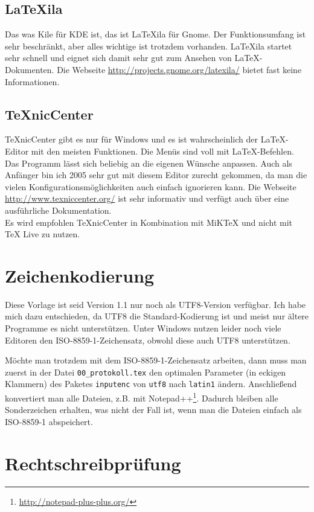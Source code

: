 \subsection{LaTeXila}

Das was Kile für KDE ist, das ist LaTeXila für Gnome. Der Funktionsumfang ist sehr beschränkt, aber alles wichtige ist trotzdem vorhanden. LaTeXila startet sehr schnell und eignet sich damit sehr gut zum Ansehen von \LaTeX-Dokumenten. Die Webseite \url{http://projects.gnome.org/latexila/} bietet fast keine Informationen.

\subsection{TeXnicCenter}

TeXnicCenter gibt es nur für Windows und es ist wahrscheinlich der \LaTeX-Editor mit den meisten Funktionen. Die Menüs sind voll mit \LaTeX-Befehlen. Das Programm lässt sich beliebig an die eigenen Wünsche anpassen. Auch als Anfänger bin ich 2005 sehr gut mit diesem Editor zurecht gekommen, da man die vielen Konfigurationsmöglichkeiten auch einfach ignorieren kann. Die Webseite \url{http://www.texniccenter.org/} ist sehr informativ und verfügt auch über eine ausführliche Dokumentation.\\
Es wird empfohlen TeXnicCenter in Kombination mit MiKTeX und nicht mit TeX Live zu nutzen.

\section{Zeichenkodierung}

Diese Vorlage ist seid Version 1.1 nur noch als UTF8-Version verfügbar. Ich habe mich dazu entschieden, da UTF8 die Standard-Kodierung ist und meist nur ältere Programme es nicht unterstützen. Unter Windows nutzen leider noch viele Editoren den ISO-8859-1-Zeichensatz, obwohl diese auch UTF8 unterstützen.

Möchte man trotzdem mit dem ISO-8859-1-Zeichensatz arbeiten, dann muss man zuerst in der Datei \verb+00_protokoll.tex+ den optimalen Parameter (in eckigen Klammern) des Paketes \verb+inputenc+ von \verb+utf8+ nach \verb+latin1+ ändern. Anschließend konvertiert man alle Dateien, z.B. mit Notepad++\footnote{\url{http://notepad-plus-plus.org/}}. Dadurch bleiben alle Sonderzeichen erhalten, was nicht der Fall ist, wenn man die Dateien einfach als ISO-8859-1 abspeichert.

\section{Rechtschreibprüfung}

